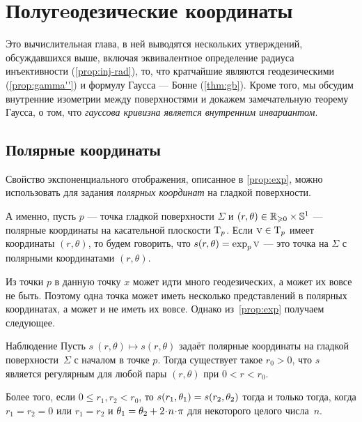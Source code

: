 \chapter{Полугeодезичeские координаты}
\label{chap:semigeodesic}

Это вычислительная глава, в ней выводятся нескольких утверждений, обсуждавшихся выше, включая 
эквивалентное определение радиуса инъективности (\ref{prop:inj-rad}),
то, что кратчайшие являются геодезическими (\ref{prop:gamma''})
и формулу Гаусса --- Бонне (\ref{thm:gb}).
Кроме того, мы обсудим внутренние изометрии между поверхностями и докажем 
замечательную теорему Гаусса, о том, что \textit{гауссова кривизна является внутренним инвариантом}.

\section{Полярные координаты}\label{sec:Polar coordinates}

{\sloppy

Свойство экспоненциального отображения, описанное в \ref{prop:exp}, можно использовать для задания \emph{полярных координат} на гладкой поверхности.

}

А именно, пусть $p$ --- точка гладкой поверхности $\Sigma$ и
$(r,\theta) \z\in \mathbb{R}_{\ge0} \times \mathbb{S}^1$ --- полярные координаты на касательной плоскости $\mathrm{T}_p$.
Если $\text{\sc{v}}\in \mathrm{T}_p$ имеет координаты $(r,\theta)$,
то будем говорить, что $s(r,\theta)\z=\exp_p\vec v$ --- это точка на $\Sigma$ с полярными координатами $(r,\theta)$.

Из точки $p$ в данную точку $x$ может идти много геодезических, а может их вовсе не быть.
Поэтому одна точка может иметь несколько представлений в полярных координатах, а может и не иметь их вовсе.
Однако из~\ref{prop:exp} получаем следующее.

\begin{thm}{Наблюдение}\label{obs:polar}
Пусть $s\:(r,\theta)\mapsto s(r,\theta)$ задаёт полярные координаты на гладкой поверхности~$\Sigma$ с началом в точке $p$.
Тогда существует такое $r_0>0$, что $s$ является регулярным для любой пары $(r,\theta)$ при $0<r<r_0$.

Более того, если $0\le r_1,r_2<r_0$, то $s(r_1,\theta_1) \z= s(r_2,\theta_2)$ тогда и только тогда, когда
$r_1=r_2=0$ или $r_1=r_2$ и $\theta_1\z=\theta_2+2\cdot n\cdot\pi$ для некоторого целого числа~$n$.
\end{thm}

